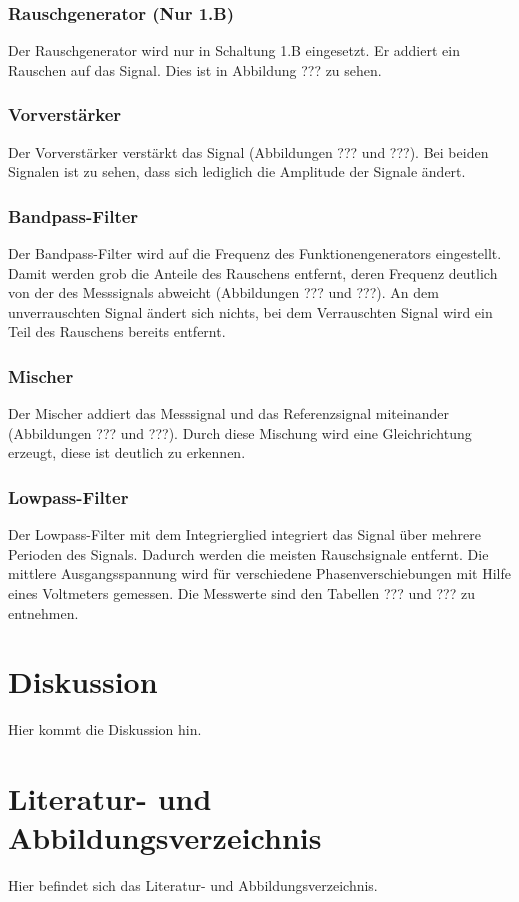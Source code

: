 \documentclass[11pt]{article}
\begin{document}
\subsubsection{Rauschgenerator (Nur 1.B)}
Der Rauschgenerator wird nur in Schaltung 1.B eingesetzt. Er addiert ein Rauschen auf das Signal. Dies ist in Abbildung ??? zu sehen. 
\subsubsection{Vorverstärker}
Der Vorverstärker verstärkt das Signal (Abbildungen ??? und ???). Bei beiden Signalen ist zu sehen, dass sich lediglich die Amplitude der Signale ändert.
\subsubsection{Bandpass-Filter}
Der Bandpass-Filter wird auf die Frequenz des Funktionengenerators eingestellt. Damit werden grob die Anteile des Rauschens entfernt, deren Frequenz deutlich von der des Messsignals abweicht (Abbildungen ??? und ???). An dem unverrauschten Signal ändert sich nichts, bei dem Verrauschten Signal wird ein Teil des Rauschens bereits entfernt.
\subsubsection{Mischer}
Der Mischer addiert das Messsignal und das Referenzsignal miteinander (Abbildungen ??? und ???). Durch diese Mischung wird eine Gleichrichtung erzeugt, diese ist deutlich zu erkennen.
\subsubsection{Lowpass-Filter}
Der Lowpass-Filter mit dem Integrierglied integriert das Signal über mehrere Perioden des Signals. Dadurch werden die meisten Rauschsignale entfernt. Die mittlere Ausgangsspannung wird für verschiedene Phasenverschiebungen mit Hilfe eines Voltmeters gemessen. Die Messwerte sind den Tabellen ??? und ??? zu entnehmen.

\section{Diskussion}
Hier kommt die Diskussion hin.
\section{Literatur- und Abbildungsverzeichnis}
Hier befindet sich das Literatur- und Abbildungsverzeichnis.
\end{document}
